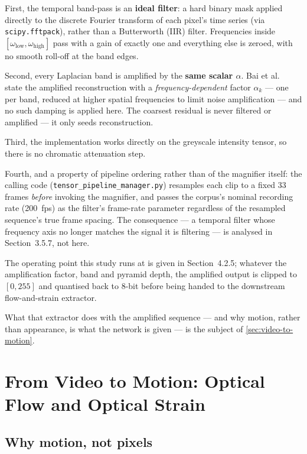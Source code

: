 First, the temporal band-pass is an \textbf{ideal filter}: a hard binary mask applied directly to the discrete Fourier transform of each pixel's time series (via \texttt{scipy.fftpack}), rather than a Butterworth (IIR) filter. Frequencies inside $[\omega_{\mathrm{low}}, \omega_{\mathrm{high}}]$ pass with a gain of exactly one and everything else is zeroed, with no smooth roll-off at the band edges.

Second, every Laplacian band is amplified by the \textbf{same scalar $\alpha$}. Bai et al.~\cite{bai2021} state the amplified reconstruction with a \textit{frequency-dependent} factor $\alpha_k$ --- one per band, reduced at higher spatial frequencies to limit noise amplification --- and no such damping is applied here. The coarsest residual is never filtered or amplified --- it only seeds reconstruction.

Third, the implementation works directly on the greyscale intensity tensor, so there is no chromatic attenuation step.

Fourth, and a property of pipeline ordering rather than of the magnifier itself: the calling code (\texttt{tensor\_pipeline\_manager.py}) resamples each clip to a fixed 33 frames \textit{before} invoking the magnifier, and passes the corpus's nominal recording rate (200~fps) as the filter's frame-rate parameter regardless of the resampled sequence's true frame spacing. The consequence --- a temporal filter whose frequency axis no longer matches the signal it is filtering --- is analysed in Section~3.5.7, not here.

The operating point this study runs at is given in Section~4.2.5; whatever the amplification factor, band and pyramid depth, the amplified output is clipped to $[0,255]$ and quantised back to 8-bit before being handed to the downstream flow-and-strain extractor.

What that extractor does with the amplified sequence --- and why motion, rather than appearance, is what the network is given --- is the subject of \autoref{sec:video-to-motion}.


\section{From Video to Motion: Optical Flow and Optical Strain}
\label{sec:video-to-motion}

\subsection{Why motion, not pixels}
\label{sec:why-motion}

